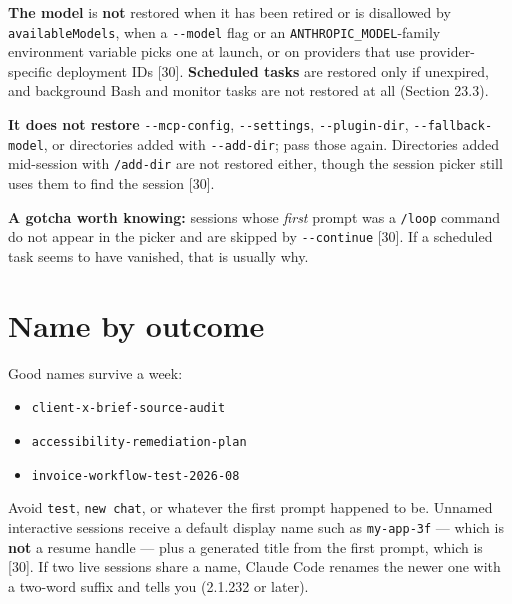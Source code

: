 \documentclass[11pt,a4paper,twoside,openany]{book}
\begin{document}
\textbf{The model} is \textbf{not} restored when it has been retired or is disallowed by \texttt{available\allowbreak{}Models}, when a \texttt{-\allowbreak{}-\allowbreak{}model} flag or an \texttt{ANTHROPIC\_\allowbreak{}MODEL}-family environment variable picks one at launch, or on providers that use provider-specific deployment IDs [30]. \textbf{Scheduled tasks} are restored only if unexpired, and background Bash and monitor tasks are not restored at all (Section 23.3).


\textbf{It does not restore} \texttt{-\allowbreak{}-\allowbreak{}mcp-\allowbreak{}config}, \texttt{-\allowbreak{}-\allowbreak{}settings}, \texttt{-\allowbreak{}-\allowbreak{}plugin-\allowbreak{}dir}, \texttt{-\allowbreak{}-\allowbreak{}fallback-\allowbreak{}model}, or directories added with \texttt{-\allowbreak{}-\allowbreak{}add-\allowbreak{}dir}; pass those again. Directories added mid-session with \texttt{/\allowbreak{}add-\allowbreak{}dir} are not restored either, though the session picker still uses them to find the session [30].


\textbf{A gotcha worth knowing:} sessions whose \emph{first} prompt was a \texttt{/\allowbreak{}loop} command do not appear in the picker and are skipped by \texttt{-\allowbreak{}-\allowbreak{}continue} [30]. If a scheduled task seems to have vanished, that is usually why.


\FloatBarrier
\setcounter{section}{1}
\section{Name by outcome}

Good names survive a week:


\begin{itemize}
\item \texttt{client-\allowbreak{}x-\allowbreak{}brief-\allowbreak{}source-\allowbreak{}audit}
\item \texttt{accessibili\allowbreak{}ty-\allowbreak{}remediation-\allowbreak{}plan}
\item \texttt{invoice-\allowbreak{}workflow-\allowbreak{}test-\allowbreak{}2026-\allowbreak{}08}
\end{itemize}

Avoid \texttt{test}, \texttt{new chat}, or whatever the first prompt happened to be. Unnamed interactive sessions receive a default display name such as \texttt{my-\allowbreak{}app-\allowbreak{}3f} — which is \textbf{not} a resume handle — plus a generated title from the first prompt, which is [30]. If two live sessions share a name, Claude Code renames the newer one with a two-word suffix and tells you (2.1.232 or later).
\end{document}
